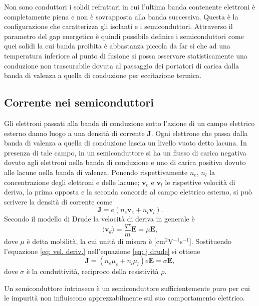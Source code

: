 Non sono conduttori i solidi refrattari in cui l'ultima banda contenente elettroni è completamente piena e non è sovrapposta alla banda successiva. Questa è la configurazione che caratterizza gli isolanti e i semiconduttori. Attraverso il parametro del gap energetico è quindi possibile definire i semiconduttori come quei solidi la cui banda proibita è abbastanza piccola da far sì che ad una temperatura inferiore al punto di fusione si possa osservare statisticamente una conduzione non trascurabile dovuta al passaggio dei portatori di carica dalla banda di valenza a quella di conduzione per eccitazione termica.

\subsection{Corrente nei semiconduttori}
Gli elettroni passati alla banda di conduzione sotto l'azione di un campo elettrico esterno danno luogo a una densità di corrente $\bm{J}$. Ogni elettrone che passa dalla banda di valenza a quella di conduzione lascia un livello vuoto detto lacuna. In presenza di tale campo, in un semiconduttore si ha un flusso di carica negativa dovuto agli elettroni nella banda di conduzione e uno di carica positiva dovuto alle lacune nella banda di valenza. Ponendo rispettivamente $n_e$, $n_l$ la concentrazione degli elettroni e delle lacune; $\bm{v}_e$ e $\bm{v}_l$ le rispettive velocità di deriva, la prima opposta e la seconda concorde al campo elettrico esterno, si può scrivere la densità di corrente come
\begin{equation}
    \label{eq: j drude}
    \bm{J}=e(n_e\bm{v}_e+n_l\bm{v}_l).
\end{equation}
Secondo il modello di Drude la velocità di deriva in generale è
\begin{equation}
    \label{eq: vel. deriv.}
    \langle\bm{v}_d\rangle=\frac{q\tau}{m}\bm{E}=\mu\bm{E},
\end{equation}
dove $\mu$ è detta mobilità, la cui unità di misura è [cm$^2$V$^{-1}$s$^{-1}$]. Sostituendo l'equazione \eqref{eq: vel. deriv.} nell'equazione \eqref{eq: j drude} si ottiene
\begin{equation}
    \bm{J}=(n_e\mu_e+n_l\mu_l)e\bm{E}=\sigma\bm{E},
\end{equation}
dove $\sigma$ è la conduttività, reciproco della resistività $\rho$.
\begin{defn}
    Un semiconduttore intrinseco è un semiconduttore sufficientemente puro per cui le impurità non influiscono apprezzabilmente sul suo comportamento elettrico.
\end{defn}
